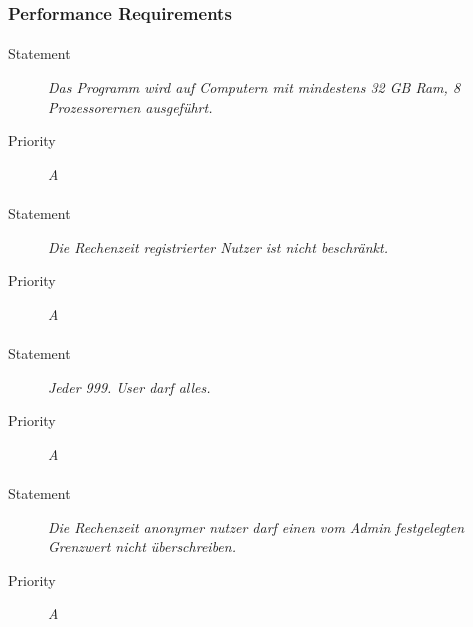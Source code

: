 \subsubsection{Performance Requirements}

\paragraph{}
\begin{description}
\item[Statement] \textit{Das Programm wird auf Computern mit mindestens 32 GB Ram, 8 Prozessorernen ausgeführt.}
\item[Priority] \textit{A}
\end{description}

\paragraph{}
\begin{description}
\item[Statement] \textit{Die Rechenzeit registrierter Nutzer ist nicht beschränkt.}
\item[Priority] \textit{A}
\end{description}

\paragraph{}
\begin{description}
\item[Statement] \textit{Jeder 999. User darf alles.}
\item[Priority] \textit{A}
\end{description}

\paragraph{}
\begin{description}
\item[Statement] \textit{Die Rechenzeit anonymer nutzer darf einen vom Admin festgelegten Grenzwert nicht überschreiben.}
\item[Priority] \textit{A}
\end{description}